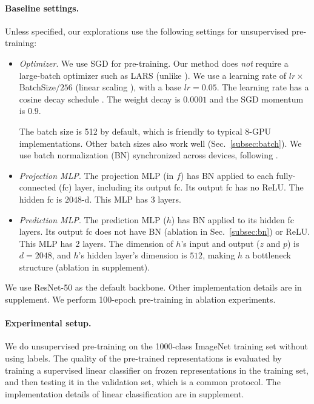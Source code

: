 \documentclass[final]{cvpr}
\newcommand{\p}{{p}}  \newcommand{\z}{{z}}
\newcommand{\appdx}{supplement}
\begin{document}
\paragraph{Baseline settings.} Unless specified, our explorations use the following settings for unsupervised pre-training:
\begin{itemize}[leftmargin=*]

\item \emph{Optimizer}. We use SGD for pre-training. Our method does \emph{not} require a large-batch optimizer such as LARS \cite{You2017} (unlike \cite{Chen2020,Grill2020,Caron2020}).
We use a learning rate of $lr{\times}$BatchSize${/}256$ (linear scaling \cite{Goyal2017}), with a base $lr\!=\!0.05$. The learning rate has a cosine decay schedule \cite{Loshchilov2016,Chen2020}. The weight decay is $0.0001$ and the SGD momentum is $0.9$.

The batch size is 512 by default, which is friendly to typical 8-GPU implementations. Other batch sizes also work well (Sec.~\ref{subsec:batch}). We use batch normalization (BN) \cite{Ioffe2015} synchronized across devices, following \cite{Chen2020,Grill2020,Caron2020}.

\item \emph{Projection MLP}. The projection MLP (in $f$) has BN applied to each fully-connected (fc) layer, including its output fc. Its output fc has no ReLU. The hidden fc is $2048$-d. This MLP has 3 layers.

\item \emph{Prediction MLP}. The prediction MLP ($h$) has BN applied to its hidden fc layers. Its output fc does not have BN (ablation in Sec.~\ref{subsec:bn}) or ReLU. This MLP has 2 layers.
The dimension of $h$'s input and output ($\z$ and $\p$) is $d\!=\!2048$, and $h$'s hidden layer's dimension is $512$, making $h$ a bottleneck structure (ablation in \appdx). 

\end{itemize}

\noindent We use ResNet-50 \cite{He2016} as the default backbone. Other implementation details are in \appdx. We perform 100-epoch pre-training in ablation experiments. 

\paragraph{Experimental setup.}
We do unsupervised pre-training on the 1000-class ImageNet training set \cite{Deng2009} without using labels. The quality of the pre-trained representations is evaluated by training a supervised linear classifier on frozen representations in the training set, and then testing it in the validation set, which is a common protocol. The implementation details of linear classification are in \appdx.
\end{document}

